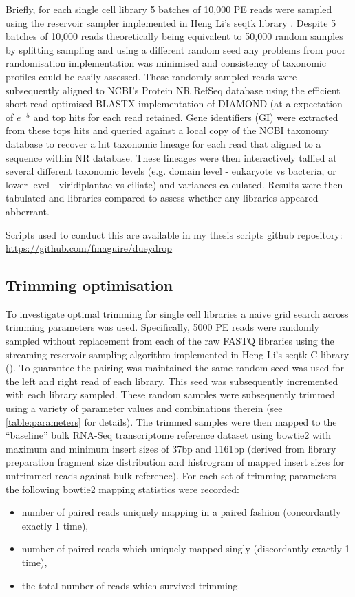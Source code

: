 Briefly, for each single cell library 5 batches of 10,000 PE reads were sampled 
using the reservoir sampler \citep{Vitter1985} implemented in Heng Li's seqtk library \citep{SeqtkGitHub}.
Despite 5 batches of 10,000 reads theoretically being equivalent to 50,000 random samples by splitting
sampling and using a different random seed any problems from poor randomisation implementation 
was minimised and consistency of taxonomic profiles could be easily assessed.
These randomly sampled reads were subsequently aligned to NCBI's Protein NR RefSeq database \citep{Pruitt2007}
using the efficient short-read optimised BLASTX implementation of DIAMOND \citep{Buchfink2015} (at a expectation
    of \(e^{-5}\) and top hits for each read retained.  Gene identifiers (GI) were extracted from these tops hits and queried against a
local copy of the NCBI taxonomy database \citep{Federhen2012} to recover a hit taxonomic lineage for each
read that aligned to a sequence within NR database. These lineages were then interactively tallied 
at several different taxonomic levels (e.g. domain level - eukaryote vs bacteria, or lower level - viridiplantae vs ciliate) and variances
calculated.  Results were then tabulated and libraries compared to assess whether any libraries appeared
abberrant.

Scripts used to conduct this are available in my thesis scripts github repository:
\url{https://github.com/fmaguire/dueydrop}

\subsection{Trimming optimisation}

To investigate optimal trimming for single cell libraries a naive grid search across trimming parameters was used.
Specifically, 5000 PE reads were randomly sampled without replacement from each of the raw FASTQ libraries 
using the streaming reservoir sampling \citep{Vitter1985} algorithm implemented in Heng Li's 
seqtk C library (\citep{SeqtkGitHub}).
To guarantee the pairing was maintained the same random seed was used for the left and right read
of each library. This seed was subsequently incremented with each library sampled.
These random samples were subsequently trimmed using a variety of parameter values and combinations therein 
(see \ref{table:parameters} for details).
The trimmed samples were then mapped to the ``baseline'' bulk RNA-Seq transcriptome reference dataset using bowtie2
\citep{Langmead2012} with maximum and minimum insert sizes of 37bp and 1161bp (derived from library preparation
fragment size distribution and histrogram of mapped insert sizes for untrimmed reads against bulk reference).
For each set of trimming parameters the following bowtie2 mapping statistics were recorded: 
\begin{itemize}
    \item number of paired reads uniquely mapping in a paired 
fashion (concordantly exactly 1 time), 
    \item number of paired reads which uniquely mapped 
singly (discordantly exactly 1 time), 
    \item the total number of reads which survived trimming.
\end{itemize}

